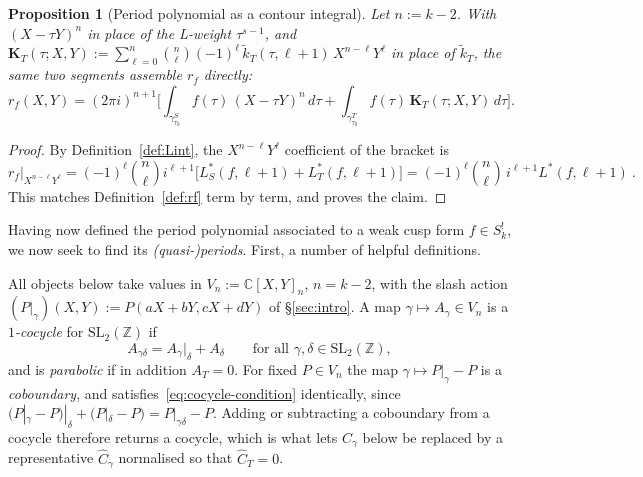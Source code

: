 \documentclass[11pt]{article}
\newtheorem{proposition}[theorem]{Proposition}
\newcommand{\ZZ}{\mathbb{Z}}
\newcommand{\CC}{\mathbb{C}}
\newcommand{\SLZ}{\mathrm{SL}_2(\ZZ)}
\newcommand{\tk}{\widetilde{k}_T}
\begin{document}
\begin{proposition}[Period polynomial as a contour integral]\label{prop:periodint}
Let $n:=k-2$. With $(X-\tau Y)^n$ in place of the L-weight $\tau^{s-1}$, and
$\mathbf K_T(\tau;X,Y):=\sum_{\ell=0}^{n}\binom{n}{\ell}(-1)^\ell\,\tk(\tau,\ell+1)\,X^{n-\ell}Y^\ell$
in place of $\tk$, the same two segments assemble $r_f$ directly:
\begin{equation}\label{eq:rf}
r_f(X, Y)=(2\pi i)^{n+1}\Big[\int_{\gamma^S_{\tau_0}} f(\tau)\,(X-\tau Y)^n\,d\tau
+\int_{\gamma^T_{\tau_0}} f(\tau)\,\mathbf K_T(\tau;X,Y)\,d\tau\Big].
\end{equation}
\end{proposition}
\begin{proof}
By Definition~\ref{def:Lint}, the $X^{n-\ell}Y^\ell$ coefficient of the bracket is
\begin{equation}
r_f|_{X^{n-\ell}Y^\ell} = (-1)^\ell\binom{n}{\ell} i^{\ell+1} 
\big[
L^*_S(f, \ell+1) 
+
L^*_T(f, \ell+1)
\big]
=(-1)^\ell\binom{n}{\ell}\,i^{\ell+1}L^*(f,\ell+1)~.
\end{equation}
This matches Definition~\ref{def:rf} term by term, and proves the claim.
\end{proof}

Having now defined the period polynomial associated to a weak cusp form $f \in S_k^!$,
we now seek to find its {\em (quasi-)periods}. First, a number of helpful definitions.

All objects below take values in $V_n:=\CC[X,Y]_n$, $n=k-2$, with the slash action
$(P|_\gamma)(X,Y):=P(aX+bY,cX+dY)$ of \S\ref{sec:intro}. A map $\gamma\mapsto A_\gamma\in V_n$ is a
\emph{$1$-cocycle} for $\SLZ$ if
\begin{equation}\label{eq:cocycle-condition}
A_{\gamma\delta}=A_\gamma|_\delta+A_\delta\qquad\text{for all }\gamma,\delta\in\SLZ ,
\end{equation}
and is \emph{parabolic} if in addition $A_T=0$. For fixed $P\in V_n$ the map
$\gamma\mapsto P|_\gamma-P$ is a \emph{coboundary}, and satisfies~\eqref{eq:cocycle-condition}
identically, since $(P|_\gamma-P)|_\delta+(P|_\delta-P)=P|_{\gamma\delta}-P$. Adding or subtracting
a coboundary from a cocycle therefore returns a cocycle, which is what lets $C_\gamma$ below be
replaced by a representative $\hat C_\gamma$ normalised so that $\hat C_T=0$.
\end{document}
